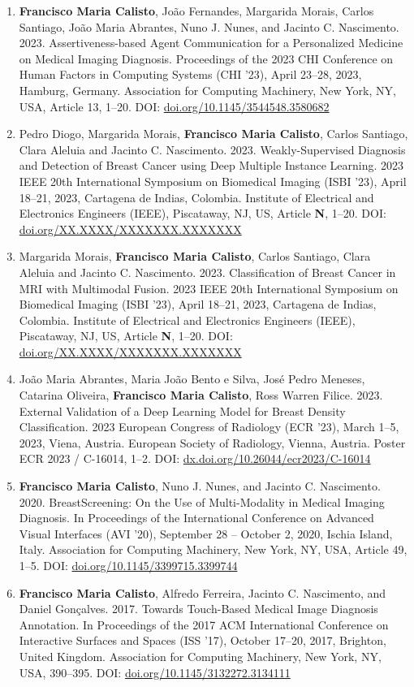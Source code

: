 \begin{enumerate}
\item {\bf Francisco Maria Calisto}, Jo\~{a}o Fernandes, Margarida Morais, Carlos Santiago, Jo\~{a}o Maria Abrantes, Nuno J. Nunes, and Jacinto C. Nascimento. 2023. Assertiveness-based Agent Communication for a Personalized Medicine on Medical Imaging Diagnosis. Proceedings of the 2023 CHI Conference on Human Factors in Computing Systems (CHI '23), April 23--28, 2023, Hamburg, Germany. Association for Computing Machinery, New York, NY, USA, Article 13, 1–20. DOI: \href{https://doi.org/10.1145/3544548.3580682}{doi.org/10.1145/3544548.3580682}
\item Pedro Diogo, Margarida Morais, {\bf Francisco Maria Calisto}, Carlos Santiago, Clara Aleluia and Jacinto C. Nascimento. 2023. Weakly-Supervised Diagnosis and Detection of Breast Cancer using Deep Multiple Instance Learning. 2023 IEEE 20th International Symposium on Biomedical Imaging (ISBI '23), April 18--21, 2023, Cartagena de Indias, Colombia. Institute of Electrical and Electronics Engineers (IEEE), Piscataway, NJ, US, Article {\bf N}, 1–20. DOI: \href{https://doi.org/XX.XXXX/XXXXXXX.XXXXXXX}{doi.org/XX.XXXX/XXXXXXX.XXXXXXX}
\item Margarida Morais, {\bf Francisco Maria Calisto}, Carlos Santiago, Clara Aleluia and Jacinto C. Nascimento. 2023. Classification of Breast Cancer in MRI with Multimodal Fusion. 2023 IEEE 20th International Symposium on Biomedical Imaging (ISBI '23), April 18--21, 2023, Cartagena de Indias, Colombia. Institute of Electrical and Electronics Engineers (IEEE), Piscataway, NJ, US, Article {\bf N}, 1–20. DOI: \href{https://doi.org/XX.XXXX/XXXXXXX.XXXXXXX}{doi.org/XX.XXXX/XXXXXXX.XXXXXXX}
\item Jo\~{a}o Maria Abrantes, Maria Jo\~{a}o Bento e Silva, Jos\'{e} Pedro Meneses, Catarina Oliveira, {\bf Francisco Maria Calisto}, Ross Warren Filice. 2023. External Validation of a Deep Learning Model for Breast Density Classification. 2023 European Congress of Radiology (ECR '23), March 1--5, 2023, Viena, Austria. European Society of Radiology, Vienna, Austria. Poster ECR 2023 / C-16014, 1–2. DOI: \href{https://dx.doi.org/10.26044/ecr2023/C-16014}{dx.doi.org/10.26044/ecr2023/C-16014}
\item {\bf Francisco Maria Calisto}, Nuno J. Nunes, and Jacinto C. Nascimento. 2020. BreastScreening: On the Use of Multi-Modality in Medical Imaging Diagnosis. In Proceedings of the International Conference on Advanced Visual Interfaces (AVI '20), September 28 -- October 2, 2020, Ischia Island, Italy. Association for Computing Machinery, New York, NY, USA, Article 49, 1–5. DOI: \href{https://doi.org/10.1145/3399715.3399744}{doi.org/10.1145/3399715.3399744}
\item {\bf Francisco Maria Calisto}, Alfredo Ferreira, Jacinto C. Nascimento, and Daniel Gonçalves. 2017. Towards Touch-Based Medical Image Diagnosis Annotation. In Proceedings of the 2017 ACM International Conference on Interactive Surfaces and Spaces (ISS '17), October 17--20, 2017, Brighton, United Kingdom. Association for Computing Machinery, New York, NY, USA, 390–395. DOI: \href{https://doi.org/10.1145/3132272.3134111}{doi.org/10.1145/3132272.3134111}
\end{enumerate}

